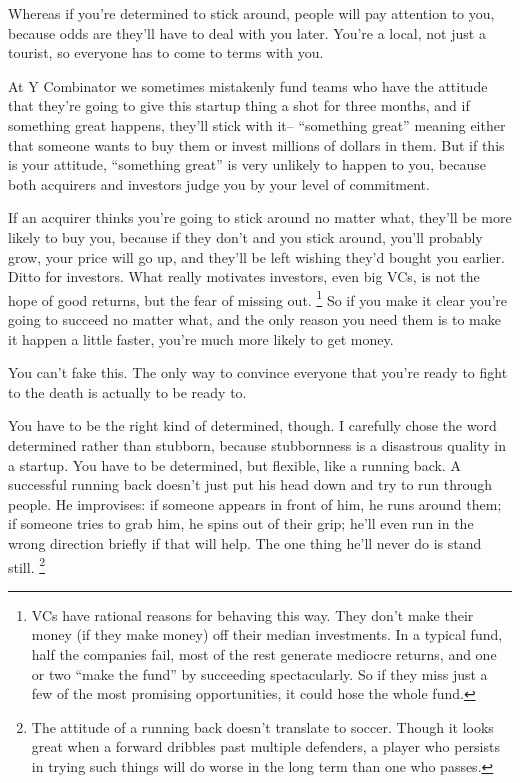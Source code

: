 \documentclass[12pt]{book}
\begin{document}
Whereas if you're determined to stick around, people will pay attention
to you, because odds are they'll have to deal with you later. You're a
local, not just a tourist, so everyone has to come to terms with you.

At Y Combinator we sometimes mistakenly fund teams who have the attitude
that they're going to give this startup thing a shot for three months,
and if something great happens, they'll stick with it-- ``something
great'' meaning either that someone wants to buy them or invest millions
of dollars in them. But if this is your attitude, ``something great'' is
very unlikely to happen to you, because both acquirers and investors
judge you by your level of commitment.

If an acquirer thinks you're going to stick around no matter what,
they'll be more likely to buy you, because if they don't and you stick
around, you'll probably grow, your price will go up, and they'll be left
wishing they'd bought you earlier. Ditto for investors. What really
motivates investors, even big VCs, is not the hope of good returns, but
the fear of missing out. \footnote{VCs have rational reasons for behaving this way. They don't make
their money (if they make money) off their median investments. In a
typical fund, half the companies fail, most of the rest generate
mediocre returns, and one or two ``make the fund'' by succeeding
spectacularly. So if they miss just a few of the most promising
opportunities, it could hose the whole fund.} So if you make it clear
you're going to succeed no matter what, and the only reason you need
them is to make it happen a little faster, you're much more likely to
get money.

You can't fake this. The only way to convince everyone that you're ready
to fight to the death is actually to be ready to.

You have to be the right kind of determined, though. I carefully chose
the word determined rather than stubborn, because stubbornness is a
disastrous quality in a startup. You have to be determined, but
flexible, like a running back. A successful running back doesn't just
put his head down and try to run through people. He improvises: if
someone appears in front of him, he runs around them; if someone tries
to grab him, he spins out of their grip; he'll even run in the wrong
direction briefly if that will help. The one thing he'll never do is
stand still. \footnote{The attitude of a running back doesn't translate to soccer.
Though it looks great when a forward dribbles past multiple defenders, a
player who persists in trying such things will do worse in the long term
than one who passes.}
\end{document}

